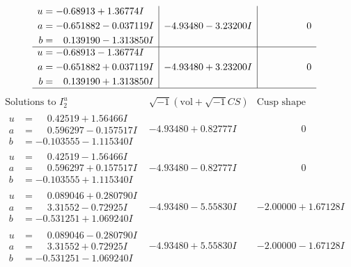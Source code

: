 \documentclass[1p]{elsarticle_modified}
\theoremstyle{definition}
\newcommand{\I}{\sqrt{-1}}
\begin{document}
$$\begin{array}{c|c|c}
\begin{aligned}
u &= -0.68913 + 1.36774 I \\
a &= -0.651882 - 0.037119 I \\
b &= \phantom{-}0.139190 - 1.313850 I\end{aligned}
 & -4.93480 - 3.23200 I & \phantom{-0.000000 } 0 \\ \hline\begin{aligned}
u &= -0.68913 - 1.36774 I \\
a &= -0.651882 + 0.037119 I \\
b &= \phantom{-}0.139190 + 1.313850 I\end{aligned}
 & -4.93480 + 3.23200 I & \phantom{-0.000000 } 0\\
 \hline 
 \end{array}$$\newpage$$\begin{array}{c|c|c}  
\text{Solutions to }I^u_{2}& \I (\text{vol} + \sqrt{-1}CS) & \text{Cusp shape}\\
 \hline 
\begin{aligned}
u &= \phantom{-}0.42519 + 1.56466 I \\
a &= \phantom{-}0.596297 - 0.157517 I \\
b &= -0.103555 - 1.115340 I\end{aligned}
 & -4.93480 + 0.82777 I & \phantom{-0.000000 } 0 \\ \hline\begin{aligned}
u &= \phantom{-}0.42519 - 1.56466 I \\
a &= \phantom{-}0.596297 + 0.157517 I \\
b &= -0.103555 + 1.115340 I\end{aligned}
 & -4.93480 - 0.82777 I & \phantom{-0.000000 } 0 \\ \hline\begin{aligned}
u &= \phantom{-}0.089046 + 0.280790 I \\
a &= \phantom{-}3.31552 - 0.72925 I \\
b &= -0.531251 + 1.069240 I\end{aligned}
 & -4.93480 - 5.55830 I & -2.00000 + 1.67128 I \\ \hline\begin{aligned}
u &= \phantom{-}0.089046 - 0.280790 I \\
a &= \phantom{-}3.31552 + 0.72925 I \\
b &= -0.531251 - 1.069240 I\end{aligned}
 & -4.93480 + 5.55830 I & -2.00000 - 1.67128 I \\ \hline\begin{aligned}

\end{aligned}
\end{array}$$
\end{document}

